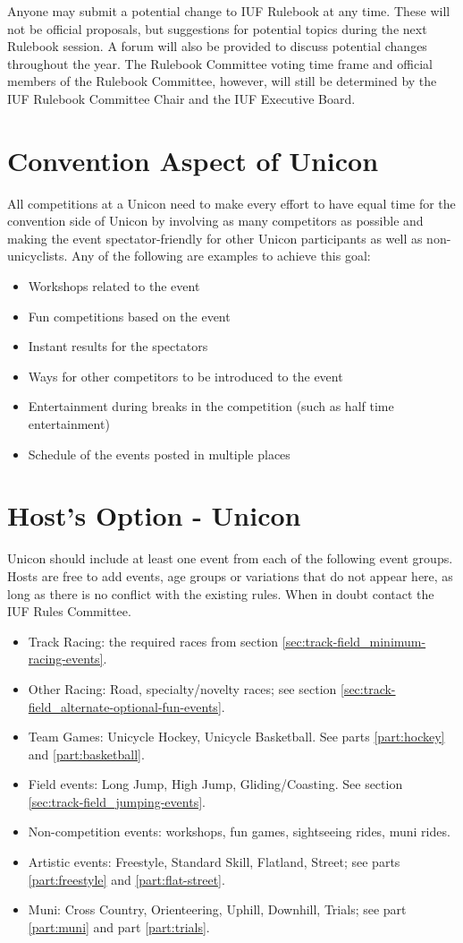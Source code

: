 Anyone may submit a potential change to IUF Rulebook at any time.
These will not be official proposals, but suggestions for potential topics during the next Rulebook session.
A forum will also be provided to discuss potential changes throughout the year.
The Rulebook Committee voting time frame and official members of the Rulebook Committee, however, will still be determined by the IUF Rulebook Committee Chair and the IUF Executive Board.

\section{Convention Aspect of Unicon}
All competitions at a Unicon need to make every effort to have equal time for the convention side of Unicon by involving as many competitors as possible and making the event spectator-friendly for other Unicon participants as well as non-unicyclists.
Any of the following are examples to achieve this goal:
\begin{itemize}
  \item Workshops related to the event
  \item Fun competitions based on the event
  \item Instant results for the spectators
  \item Ways for other competitors to be introduced to the event
  \item Entertainment during breaks in the competition (such as half time entertainment)
  \item Schedule of the events posted in multiple places
\end{itemize}

\section{Host's Option - Unicon}
Unicon should include at least one event from each of the following event groups. 
Hosts are free to add events, age groups or variations that do not appear here, as long as there is no conflict with the existing rules. 
When in doubt contact the IUF Rules Committee.
\begin{itemize}
  \item Track Racing: the required races from section \ref{sec:track-field_minimum-racing-events}.
  \item Other Racing: Road, specialty/novelty races; see section \ref{sec:track-field_alternate-optional-fun-events}.
  \item Team Games: Unicycle Hockey, Unicycle Basketball. See parts \ref{part:hockey} and \ref{part:basketball}.
  \item Field events: Long Jump, High Jump, Gliding/Coasting. See section \ref{sec:track-field_jumping-events}.
  \item Non-competition events: workshops, fun games, sightseeing rides, muni rides.
  \item Artistic events: Freestyle, Standard Skill, Flatland, Street; see parts \ref{part:freestyle} and \ref{part:flat-street}.
  \item Muni: Cross Country, Orienteering, Uphill, Downhill, Trials; see part \ref{part:muni} and part \ref{part:trials}.
\end{itemize}

